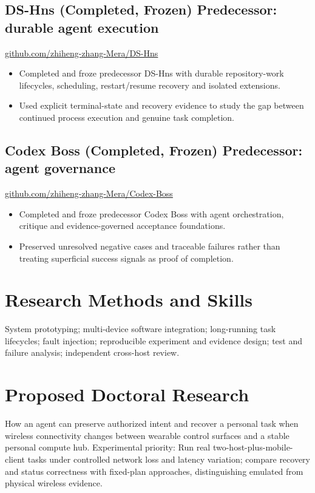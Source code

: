 \documentclass[10pt,a4paper]{article}
\begin{document}
\subsection*{DS-Hns (Completed, Frozen) \hfill \small Predecessor: durable agent execution}
\href{https://github.com/zhiheng-zhang-Mera/DS-Hns}{github.com/zhiheng-zhang-Mera/DS-Hns}
\begin{itemize}
\item Completed and froze predecessor DS-Hns with durable repository-work lifecycles, scheduling, restart/resume recovery and isolated extensions.
\item Used explicit terminal-state and recovery evidence to study the gap between continued process execution and genuine task completion.
\end{itemize}

\subsection*{Codex Boss (Completed, Frozen) \hfill \small Predecessor: agent governance}
\href{https://github.com/zhiheng-zhang-Mera/Codex-Boss}{github.com/zhiheng-zhang-Mera/Codex-Boss}
\begin{itemize}
\item Completed and froze predecessor Codex Boss with agent orchestration, critique and evidence-governed acceptance foundations.
\item Preserved unresolved negative cases and traceable failures rather than treating superficial success signals as proof of completion.
\end{itemize}

\section{Research Methods and Skills}
System prototyping; multi-device software integration; long-running task lifecycles; fault injection; reproducible experiment and evidence design; test and failure analysis; independent cross-host review.

\section{Proposed Doctoral Research}
How an agent can preserve authorized intent and recover a personal task when wireless connectivity changes between wearable control surfaces and a stable personal compute hub. Experimental priority: Run real two-host-plus-mobile-client tasks under controlled network loss and latency variation; compare recovery and status correctness with fixed-plan approaches, distinguishing emulated from physical wireless evidence.

\par\smallskip{}
\end{document}
